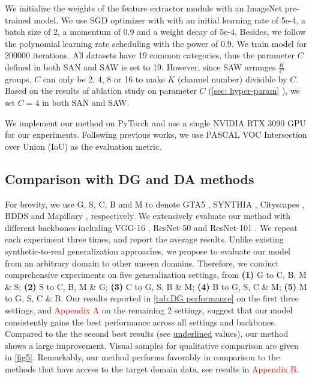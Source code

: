 \documentclass[10pt,twocolumn,letterpaper]{article}
\begin{document}
We initialize the weights of the feature extractor module with an ImageNet \cite{deng2009imagenet} pre-trained model. We use SGD \cite{krizhevsky2012imagenet} optimizer with with an initial learning rate of 5e-4, a batch size of 2, a momentum of 0.9 and a weight decay of 5e-4. Besides, we follow the polynomial learning rate scheduling \cite{chen2017rethinking} with the power of 0.9. We train model for 200000 iterations. All datasets have 19 common categories, thus the parameter $C$ defined in both SAN and SAW is set to 19. However, since SAW arranges $\frac{K}{C}$ groups, $C$ can only be 2, 4, 8 or 16 to make $K$ (channel number) divisible by $C$. Based on the results of ablation study on parameter $C$ (\cref{sec: hyper-param}
), we set $C=4$ in both SAN and SAW.

We implement our method on PyTorch \cite{paszke2017automatic} and use a single NVIDIA RTX 3090 GPU for our experiments. Following previous works, we use PASCAL VOC Intersection over Union (IoU) \cite{everingham2015pascal} as the evaluation metric.



\subsection{Comparison with DG and DA methods}
For brevity, we use G, S, C, B and M to denote GTA5 \cite{richter2016playing}, SYNTHIA \cite{ros2016synthia}, Cityscapes \cite{cordts2016cityscapes}, BDDS \cite{yu2018bdd100k} and Mapillary \cite{neuhold2017mapillary}, respectively. 
We extensively evaluate our method with different backbones including VGG-16 \cite{simonyan2014very}, ResNet-50 and ResNet-101 \cite{he2016deep}. We repeat each experiment three times, and report the average results.
Unlike existing synthetic-to-real generalization approaches, 
we propose to evaluate our model from an arbitrary domain to other unseen domains. Therefore, we conduct comprehensive experiments on five generalization settings, from \textbf{(1)} G to C, B, M \& S; \textbf{(2)} S to C, B, M \& G; \textbf{(3)} C to G, S, B \& M; \textbf{(4)} B to G, S, C \& M; \textbf{(5)} M to G, S, C \& B.
Our results reported in \cref{tab:DG performance} on the first three settings, and \textcolor{red}{Appendix A} on the remaining 2 settings, suggest that our model consistently gains the best performance across all settings and backbones.
Compared to the the second best results (see \underline{underlined} values), our method shows a large improvement. Visual samples for qualitative comparison are given in \cref{fig5}. Remarkably, our method performs favorably in comparison to the methods that have access to the target domain data, see results in \textcolor{red}{Appendix B}.  
\end{document}
